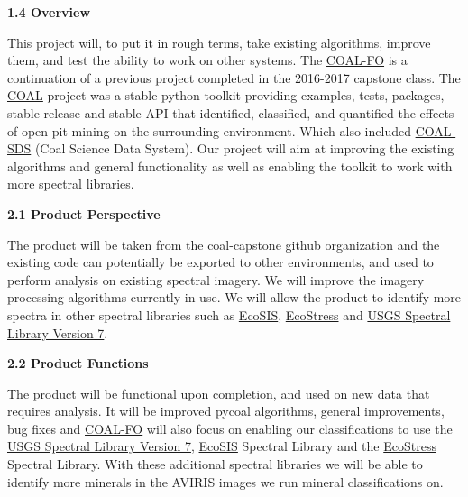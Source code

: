 \documentclass[a4paper,12pt]{article}
\begin{document}
\noindent \textbf{1.4 Overview}\newline


\noindent This project will, to put it in rough terms, take existing algorithms, improve them, and test the ability to work on other systems. The \href{https://capstone-coal.github.io/team}{COAL-FO} is a continuation of a previous project completed in the 2016-2017 capstone class. The \href{https://capstone-coal.github.io/}{COAL} project was a stable python toolkit providing examples, tests, packages, stable release and stable API that identified, classified, and quantified the effects of open-pit mining on the surrounding environment. Which also included \href{https://github.com/capstone-coal/coal-sds}{COAL-SDS} (Coal Science Data System). Our project will aim at improving the existing algorithms and general functionality as well as enabling the toolkit to work with more spectral libraries. \newline


\newline


\noindent \textbf{2.1 Product Perspective}\newline


\noindent The product will be taken from the coal-capstone github organization and the existing code can potentially be exported to other environments, and used to perform analysis on existing spectral imagery. We will improve the imagery processing algorithms currently in use. We will allow the product to identify more spectra in other spectral libraries such as \href{https://ecosis.org/}{EcoSIS}, \href{https://speclib.jpl.nasa.gov/}{EcoStress} and \href{https://speclab.cr.usgs.gov/spectral-lib.html}{USGS Spectral Library Version 7}.\newline


\noindent \textbf{2.2 Product Functions}\newline


\noindent The product will be functional upon completion, and used on new data that requires analysis. It will be improved pycoal algorithms, general improvements, bug fixes and  \href{https://capstone-coal.github.io/team}{COAL-FO} will also focus on enabling our classifications to use the \href{https://speclab.cr.usgs.gov/spectral-lib.html}{USGS Spectral Library Version 7}, \href{https://ecosis.org/}{EcoSIS} Spectral Library and the \href{https://speclib.jpl.nasa.gov/}{EcoStress} Spectral Library.  With these additional spectral libraries we will be able to identify more minerals in the AVIRIS images we run mineral classifications on.\newline
\end{document}

